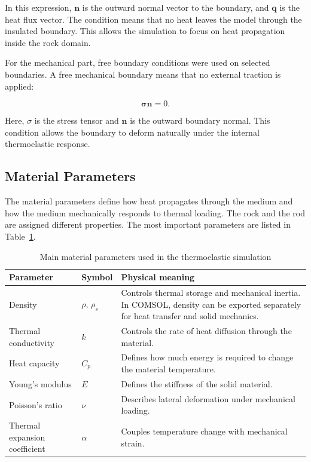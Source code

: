 In this expression, \(\mathbf{n}\) is the outward normal vector to the boundary, and \(\mathbf{q}\) is the heat flux vector. The condition means that no heat leaves the model through the insulated boundary. This allows the simulation to focus on heat propagation inside the rock domain.

For the mechanical part, free boundary conditions were used on selected boundaries. A free mechanical boundary means that no external traction is applied:

\begin{equation}
\boldsymbol{\sigma}\mathbf{n} = 0 .
\end{equation}

Here, \({\sigma}\) is the stress tensor and \(\mathbf{n}\) is the outward boundary normal. This condition allows the boundary to deform naturally under the internal thermoelastic response.

\subsection{Material Parameters}

The material parameters define how heat propagates through the medium and how the medium mechanically responds to thermal loading. The rock and the rod are assigned different properties. The most important parameters are listed in Table~\ref{tab:comsol_material_parameters}.

\begin{table}[H]
\centering
\caption{Main material parameters used in the thermoelastic simulation}
\label{tab:comsol_material_parameters}
\begin{tabular}{p{}|p{}|p{}}
\hline
Parameter & Symbol & Physical meaning \\
\hline
Density & \(\rho\), \(\rho_s\) & Controls thermal storage and mechanical inertia. In COMSOL, density can be exported separately for heat transfer and solid mechanics. \\
\hline
Thermal conductivity & \(k\) & Controls the rate of heat diffusion through the material. \\
\hline
Heat capacity & \(C_p\) & Defines how much energy is required to change the material temperature. \\
\hline
Young's modulus & \(E\) & Defines the stiffness of the solid material. \\
\hline
Poisson's ratio & \(\nu\) & Describes lateral deformation under mechanical loading. \\
\hline
Thermal expansion coefficient & \(\alpha\) & Couples temperature change with mechanical strain. \\
\hline
\end{tabular}
\end{table}

